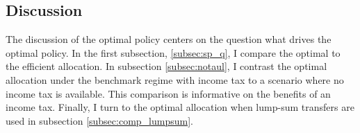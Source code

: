 \begin{figure}[h!!]
\begin{minipage}[]{0.32\textwidth}
	\end{minipage}
\end{figure} 
\subsection{Discussion}\label{subsec:dis}
The discussion of the optimal policy centers on the question what drives the optimal policy. In the first subsection, \ref{subsec:sp_q}, I compare the optimal to the efficient allocation. In subsection \ref{subsec:notaul}, I contrast the optimal allocation under the benchmark regime with income tax to a scenario where no income tax is available. This comparison is informative on the benefits of an income tax.
Finally, I turn to the optimal allocation when lump-sum transfers are used in subsection \ref{subsec:comp_lumpsum}. 


